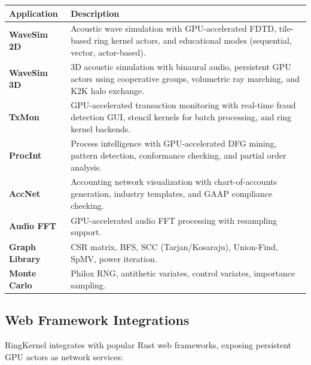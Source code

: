 \documentclass[11pt,a4paper]{article}
\begin{document}
\begin{table}[h!]
\centering
\renewcommand{\arraystretch}{1.25}
\begin{tabularx}{\textwidth}{>{\bfseries\color{brand}}l X}
\toprule
\textbf{Application} & \textbf{Description} \\
\midrule
WaveSim 2D &
  Acoustic wave simulation with GPU-accelerated FDTD, tile-based ring kernel
  actors, and educational modes (sequential, vector, actor-based). \\
WaveSim 3D &
  3D acoustic simulation with binaural audio, persistent GPU actors using
  cooperative groups, volumetric ray marching, and K2K halo exchange. \\
TxMon &
  GPU-accelerated transaction monitoring with real-time fraud detection GUI,
  stencil kernels for batch processing, and ring kernel backends. \\
ProcInt &
  Process intelligence with GPU-accelerated DFG mining, pattern detection,
  conformance checking, and partial order analysis. \\
AccNet &
  Accounting network visualization with chart-of-accounts generation,
  industry templates, and GAAP compliance checking. \\
Audio FFT &
  GPU-accelerated audio FFT processing with resampling support. \\
Graph Library &
  CSR matrix, BFS, SCC (Tarjan/Kosaraju), Union-Find, SpMV, power iteration. \\
Monte Carlo &
  Philox RNG, antithetic variates, control variates, importance sampling. \\
\bottomrule
\end{tabularx}
\end{table}

\subsection{Web Framework Integrations}

RingKernel integrates with popular Rust web frameworks, exposing persistent GPU
actors as network services:
\end{document}

